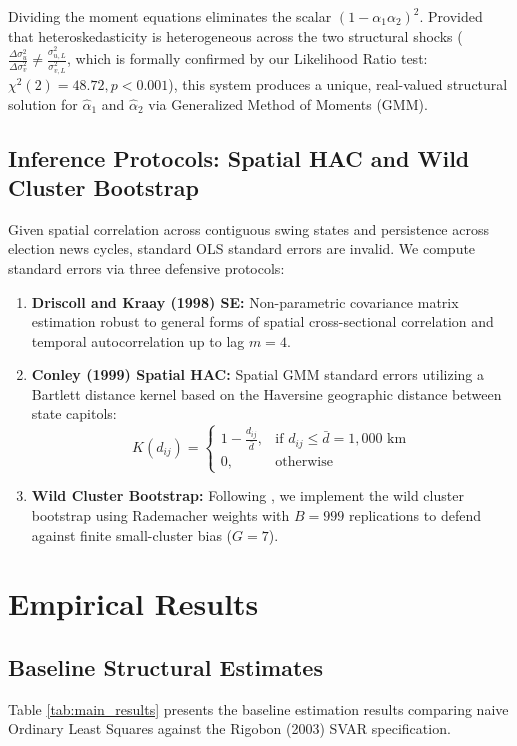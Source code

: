 \documentclass[12pt, a4paper]{article}
\begin{document}
Dividing the moment equations eliminates the scalar $(1 - \alpha_1 \alpha_2)^2$. Provided that heteroskedasticity is heterogeneous across the two structural shocks ($\frac{\Delta \sigma_u^2}{\Delta \sigma_v^2} \ne \frac{\sigma_{u, L}^2}{\sigma_{v, L}^2}$, which is formally confirmed by our Likelihood Ratio test: $\chi^2(2) = 48.72, p < 0.001$), this system produces a unique, real-valued structural solution for $\hat{\alpha}_1$ and $\hat{\alpha}_2$ via Generalized Method of Moments (GMM).

\subsection{Inference Protocols: Spatial HAC and Wild Cluster Bootstrap}
Given spatial correlation across contiguous swing states and persistence across election news cycles, standard OLS standard errors are invalid. We compute standard errors via three defensive protocols:
\begin{enumerate}
    \item \textbf{Driscoll and Kraay (1998) SE:} Non-parametric covariance matrix estimation robust to general forms of spatial cross-sectional correlation and temporal autocorrelation up to lag $m = 4$.
    \item \textbf{Conley (1999) Spatial HAC:} Spatial GMM standard errors utilizing a Bartlett distance kernel based on the Haversine geographic distance between state capitols:
    \begin{equation}
    K(d_{ij}) = \begin{cases} 1 - \frac{d_{ij}}{\bar{d}}, & \text{if } d_{ij} \le \bar{d} = 1,000 \text{ km} \\ 0, & \text{otherwise} \end{cases}
    \end{equation}
    \item \textbf{Wild Cluster Bootstrap:} Following \citet{Cameron2008}, we implement the wild cluster bootstrap using Rademacher weights with $B = 999$ replications to defend against finite small-cluster bias ($G = 7$).
\end{enumerate}

\section{Empirical Results}
\label{sec:results}

\subsection{Baseline Structural Estimates}
Table \ref{tab:main_results} presents the baseline estimation results comparing naive Ordinary Least Squares against the Rigobon (2003) SVAR specification.
\end{document}
